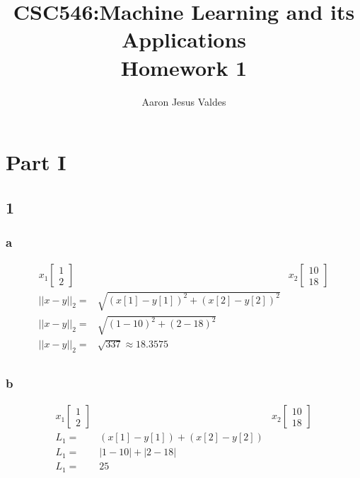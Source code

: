 \documentclass[11pt]{article}
\title{\Huge{CSC546:Machine Learning and its Applications }\\\LARGE{Homework 1}}
\author{Aaron Jesus Valdes}
\begin{document}
	\maketitle
	\clearpage
	\section*{Part I}
		\subsection*{1}
			\subsubsection*{a}
				\begin{align}
					x_1\begin{bmatrix}
					1\\2
					\end{bmatrix}&
					&x_2\begin{bmatrix}
					10\\18
					\end{bmatrix} \\
					||x-y||_2=&\sqrt{(x[1]-y[1])^2 +(x[2]-y[2])^2}\\
					||x-y||_2=&\sqrt{(1-10)^2 +(2-18)^2}\\
					||x-y||_2=&\sqrt{337}\approx 18.3575\\
				\end{align}
			\subsubsection*{b}
				\begin{align}
				x_1\begin{bmatrix}
				1\\2
				\end{bmatrix}&
				&x_2\begin{bmatrix}
				10\\18
				\end{bmatrix} \\
				L_1=&(x[1]-y[1]) + (x[2]-y[2])\\
				L_1=&|1-10| + |2-18|\\
				L_1=&25\\
				\end{align}
\end{document}
